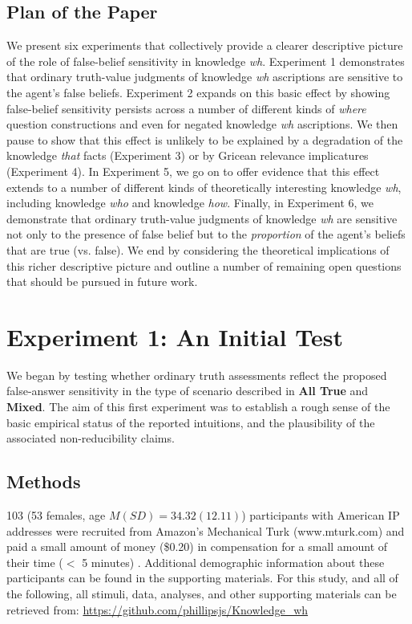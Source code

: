 \documentclass[a4paper]{article}
\begin{document}
\subsection{Plan of the Paper}

We present six experiments that collectively provide a clearer descriptive picture of the role of false-belief sensitivity in knowledge \textit{wh}. Experiment 1 demonstrates that ordinary truth-value judgments of knowledge \textit{wh} ascriptions are sensitive to the agent's false beliefs. Experiment 2 expands on this basic effect by showing false-belief sensitivity persists across a number of different kinds of \textit{where} question constructions and even for negated knowledge \textit{wh} ascriptions. We then pause to show that this effect is unlikely to be explained by a degradation of the knowledge \textit{that} facts (Experiment 3) or by Gricean relevance implicatures (Experiment 4). In Experiment 5, we go on to offer evidence that this effect extends to a number of different kinds of theoretically interesting knowledge \textit{wh}, including knowledge \textit{who} and knowledge \textit{how}. Finally, in Experiment 6, we demonstrate that ordinary truth-value judgments of knowledge \textit{wh} are sensitive not only to the presence of false belief but to the \textit{proportion} of the agent's beliefs that are true (vs. false). We end by considering the theoretical implications of this richer descriptive picture and outline a number of remaining open questions that should be pursued in future work. 

\section{Experiment 1: An Initial Test} \label{sec:study1}

We began by testing whether ordinary truth assessments reflect the proposed false-answer sensitivity in the type of scenario described in \textbf{All True} and \textbf{Mixed}. The aim of this first experiment was to establish a rough sense of the basic empirical status of the reported intuitions, and the plausibility of the associated non-reducibility claims.

\subsection{Methods} \label{sec:study1Methods} 103 (53 females, age $M(SD) = 34.32(12.11)$) participants with American IP addresses were recruited from Amazon's Mechanical Turk (www.mturk.com) and paid a small amount of money (\$0.20) in compensation for a small amount of their time ($<$ 5 minutes) \citep{buhrmester2011amazon,paolacci2014inside,sprouse2011validation}. Additional demographic information about these participants can be found in the supporting materials. For this study, and all of the following, all stimuli, data, analyses, and other supporting materials can be retrieved from: \url{https://github.com/phillipsjs/Knowledge_wh}
\end{document}
